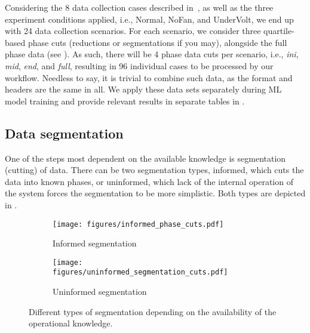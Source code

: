 Considering the 8 data collection cases described in~\cite{Odyurt:2021:PPFT}, as well as the three experiment conditions applied, i.e., Normal, NoFan, and UnderVolt, we end up with 24 data collection scenarios. For each scenario, we consider three quartile-based phase cuts (reductions or segmentations if you may), alongside the full phase data (see ). As such, there will be 4 phase data cuts per scenario, i.e., \emph{ini}, \emph{mid}, \emph{end}, and \emph{full}, resulting in 96 individual cases to be processed by our workflow. 
Needless to say, it is trivial to combine such data, as the format and headers are the same in all. We apply these data sets separately during ML model training and provide relevant results in separate tables in .

\subsection{Data segmentation}
One of the steps most dependent on the available knowledge is segmentation (cutting) of data. There can be two segmentation types, informed, which cuts the data into known phases, or uninformed, which lack of the internal operation of the system forces the segmentation to be more simplistic. Both types are depicted in .
%
\begin{figure}[htbp]
    \centering
    \begin{subfigure}{\linewidth}
    	\centering
	    \texttt{[image: figures/informed\_phase\_cuts.pdf]}
	    \caption{Informed segmentation}
	    \label{fig:informed_segmentation}
    \end{subfigure}
    \qquad
    \begin{subfigure}{\linewidth}
    	\centering
    	\texttt{[image: figures/uninformed\_segmentation\_cuts.pdf]}
		\caption{Uninformed segmentation}
		\label{fig:uninformed_segmentation}
    \end{subfigure}
	\caption{Different types of segmentation depending on the availability of the operational knowledge.}
	\label{fig:data_segmentation}
\end{figure}


